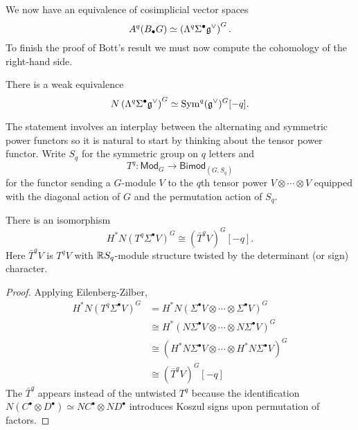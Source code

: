 \documentclass{amsart}
\begin{document}
We now have an equivalence of cosimplicial vector spaces
\begin{equation*}
    A^q(B_\bullet G) \simeq \left( \Lambda^q\Sigma^\bullet\mathfrak g^\vee \right)^G.
\end{equation*}
To finish the proof of Bott's result we must now compute the cohomology of the 
right-hand side.
\begin{proposition}
    There is a weak equivalence
    \begin{equation*}
        N\left( \Lambda^q\Sigma^\bullet\mathfrak g^\vee \right)^G
        \simeq \operatorname{Sym}^q(\mathfrak g^\vee)^G[-q].
    \end{equation*}
\end{proposition}

The statement involves an interplay between the alternating and symmetric power 
functors so it is natural to start by thinking about the tensor power functor.
Write $S_q$ for the symmetric group on $q$ letters and
\begin{equation*}
    T^q: \mathsf{Mod}_G \to \mathsf{Bimod}_{(G, S_q)}
\end{equation*}
for the functor sending a $G$-module $V$ to the $q$th tensor power
$V\otimes \cdots\otimes V$ equipped with the diagonal action of $G$ and the 
permutation action of $S_q$.

\begin{proposition}
    There is an isomorphism
    \begin{equation*}
        H^*N(T^q\Sigma^\bullet V)^G \cong (\bar T^qV)^G[-q].
    \end{equation*}
    Here $\bar T^qV$ is $T^qV$ with $\mathbb{R} S_q$-module structure twisted by the 
    determinant (or sign) character.
\end{proposition}
\begin{proof}
    Applying Eilenberg-Zilber,
    \begin{align*}
        H^*N(T^q\Sigma^\bullet V)^G &= H^*N(\Sigma^\bullet V\otimes \cdots 
        \otimes \Sigma^\bullet V)^G \\
        &\cong H^*\left( N\Sigma^\bullet V \otimes \cdots \otimes 
        N\Sigma^\bullet V\right)^G \\
        &\cong \left(H^*N\Sigma^\bullet V\otimes\cdots\otimes H^*N\Sigma^\bullet 
        V\right)^G \\
        &\cong (\bar T^q V)^G[-q]
    \end{align*}
    The $\bar T^q$ appears instead of the untwisted $T^q$ because the 
    identification $N(C^\bullet \otimes D^\bullet)\simeq NC^\bullet \otimes 
    ND^\bullet$ introduces Koszul signs upon permutation of factors.
\end{proof}
\end{document}
